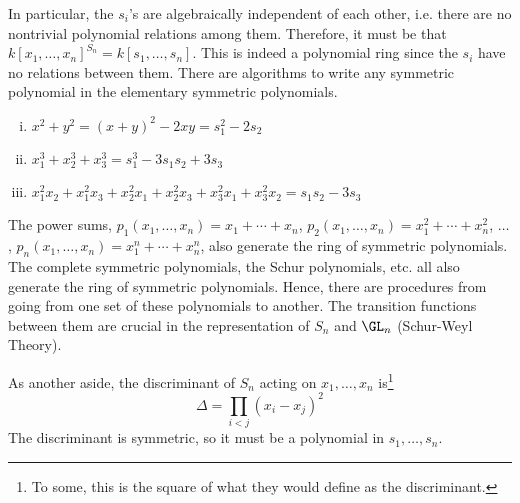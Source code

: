 In particular, the $s_i$'s are algebraically independent of each other, i.e. there are no nontrivial polynomial relations among them. Therefore, it must be that $k[x_1,\ldots,x_n]^{S_n}= k[s_1,\ldots,s_n]$. This is indeed a polynomial ring since the $s_i$ have no relations between them. There are algorithms to write any symmetric polynomial in the elementary symmetric polynomials. 


\begin{ex} \hfill
        \begin{enumerate}[(i)]
        \item $x^2+y^2=(x+y)^2-2xy= s_1^2-2s_2$
        \item $x_1^3+x_2^3+x_3^3= s_1^3-3s_1s_2+3s_3$
        \item $x_1^2x_2+x_1^2x_3+x_2^2x_1+x_2^2x_3+x_3^2x_1+x_3^2x_2= s_1s_2 - 3s_3$
        \end{enumerate} \xqed
\end{ex}


\begin{rem}
The power sums, $p_1(x_1,\ldots,x_n)=x_1+\cdots+x_n$, $p_2(x_1,\ldots,x_n)=x_1^2+\cdots+x_n^2$, $\ldots$, $p_n(x_1,\ldots,x_n)=x_1^n+\cdots+x_n^n$, also generate the ring of symmetric polynomials. The complete symmetric polynomials, the Schur polynomials, etc. all also generate the ring of symmetric polynomials. Hence, there are procedures from going from one set of these polynomials to another. The transition functions between them are crucial in the representation of $S_n$ and $\GL_n$ (Schur-Weyl Theory). 
\end{rem}

































As another aside, the discriminant of $S_n$ acting on $x_1,\ldots,x_n$ is\footnote{To some, this is the square of what they would define as the discriminant.}
	\[
	\Delta= \prod_{i<j} (x_i - x_j)^2
	\]
The discriminant is symmetric, so it must be a polynomial in $s_1,\ldots,s_n$. 


